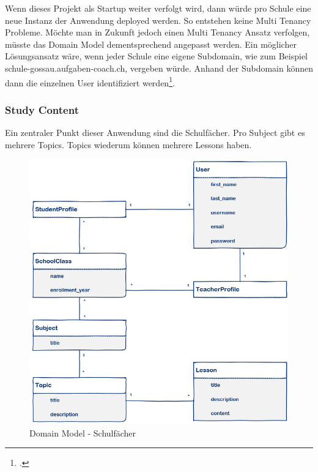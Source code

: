 Wenn dieses Projekt als Startup weiter verfolgt wird, dann würde pro Schule eine neue Instanz der Anwendung deployed werden. So entstehen keine Multi Tenancy Probleme. Möchte man in Zukunft jedoch einen Multi Tenancy Ansatz verfolgen, müsste das Domain Model dementsprechend angepasst werden. Ein möglicher Lösungsansatz wäre, wenn jeder Schule eine eigene Subdomain, wie zum Beispiel schule-gossau.aufgaben-coach.ch, vergeben würde. Anhand der Subdomain können dann die einzelnen User identifiziert werden\footcite{django:multi_tenancy}.

\newpage
\subsubsection*{Study Content}
Ein zentraler Punkt dieser Anwendung sind die Schulfächer. Pro Subject gibt es mehrere Topics. Topics wiederum können mehrere Lessons haben. \\ 

\begin{figure}[H]
\begin{center}
	\includegraphics[width=\textwidth, keepaspectratio]{images/domain_model_study_content.png}
	\caption{Domain Model - Schulfächer}
	\label{fig:domain_model_study_content}
\end{center}
\end{figure}


